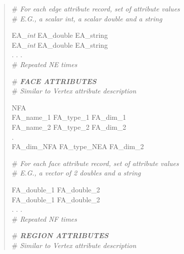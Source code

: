 \documentclass[12pt]{article}
\begin{document}
\begin{verse}
\# \textit{For each edge attribute record, set of attribute values} \\
\# \textit{E.G., a scalar int, a scalar double and a string}
\vspace{1ex}

EA\_\textit{int} \hspace{0.5ex} EA\_double \hspace{0.5ex} EA\_string \\
EA\_\textit{int} \hspace{0.5ex} EA\_double \hspace{0.5ex} EA\_string \\
. . . \\
\# \textit{Repeated NE times}
\vspace{2ex}

\# \textit{\textbf{FACE ATTRIBUTES}} \\
\# \textit{Similar to Vertex attribute description}
\vspace{1ex}

NFA \hspace{0.5ex} \\
FA\_name\_1 \hspace{0.5ex} FA\_type\_1 \hspace{0.5ex} FA\_dim\_1 \\ 
FA\_name\_2 \hspace{0.5ex} FA\_type\_2 \hspace{0.5ex} FA\_dim\_2 \\
. \\
FA\_dim\_NFA \hspace{0.5ex} FA\_type\_NEA \hspace{0.5ex} FA\_dim\_2  
\vspace{1ex}

\# \textit{For each face attribute record, set of attribute values} \\
\# \textit{E.G., a vector of 2 doubles and a string}
\vspace{1ex}

FA\_double\_1 \hspace{0.5ex} FA\_double\_2 \\
FA\_double\_1 \hspace{0.5ex} FA\_double\_2 \\
. . . \\
\# \textit{Repeated NF times}
\vspace{2ex}

\newpage
\# \textit{\textbf{REGION ATTRIBUTES}} \\
\# \textit{Similar to Vertex attribute description}
\vspace{1ex}


\end{verse}
\end{document}
